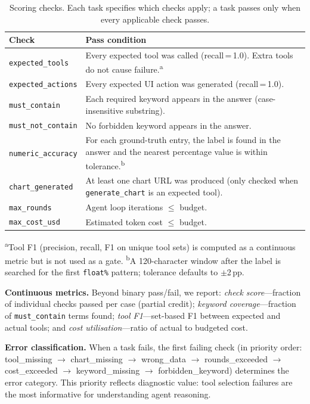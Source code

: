 \documentclass[10pt,twocolumn]{article}
\begin{document}
\begin{table}[t]
\caption{Scoring checks. Each task specifies which checks apply; a task passes only when every applicable check passes.}
\label{tab:checks}
\centering
\small
\begin{tabular}{lp{4.8cm}}
\toprule
\textbf{Check} & \textbf{Pass condition} \\
\midrule
\texttt{expected\_tools} & Every expected tool was called (recall\,=\,1.0). Extra tools do not cause failure.\textsuperscript{a} \\
\texttt{expected\_actions} & Every expected UI action was generated (recall\,=\,1.0). \\
\texttt{must\_contain} & Each required keyword appears in the answer (case-insensitive substring). \\
\texttt{must\_not\_contain} & No forbidden keyword appears in the answer. \\
\texttt{numeric\_accuracy} & For each ground-truth entry, the label is found in the answer and the nearest percentage value is within tolerance.\textsuperscript{b} \\
\texttt{chart\_generated} & At least one chart URL was produced (only checked when \texttt{generate\_chart} is an expected tool). \\
\texttt{max\_rounds} & Agent loop iterations $\leq$ budget. \\
\texttt{max\_cost\_usd} & Estimated token cost $\leq$ budget. \\
\bottomrule
\end{tabular}
\vspace{2pt}
\raggedright\footnotesize
\textsuperscript{a}Tool F1 (precision, recall, F1 on unique tool sets) is computed as a continuous metric but is not used as a gate.
\textsuperscript{b}A 120-character window after the label is searched for the first \texttt{float\%} pattern; tolerance defaults to $\pm$2\,pp.
\end{table}

\textbf{Continuous metrics.} Beyond binary pass/fail, we report: \emph{check score}---fraction of individual checks passed per case (partial credit); \emph{keyword coverage}---fraction of \texttt{must\_contain} terms found; \emph{tool F1}---set-based F1 between expected and actual tools; and \emph{cost utilisation}---ratio of actual to budgeted cost.

\textbf{Error classification.} When a task fails, the first failing check (in priority order: tool\_missing $\to$ chart\_missing $\to$ wrong\_data $\to$ rounds\_exceeded $\to$ cost\_exceeded $\to$ keyword\_missing $\to$ forbidden\_keyword) determines the error category. This priority reflects diagnostic value: tool selection failures are the most informative for understanding agent reasoning.
\end{document}

